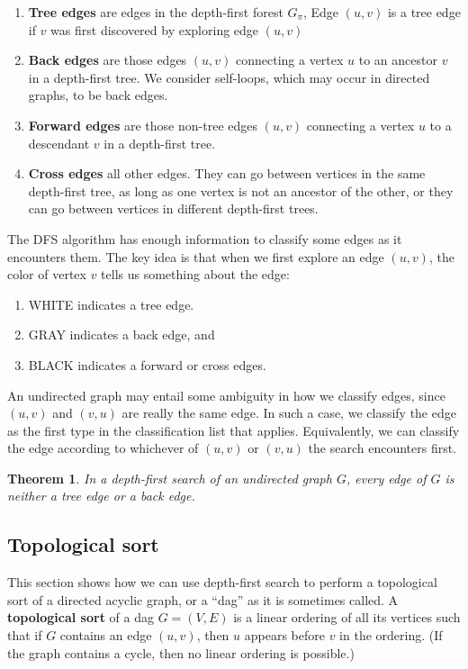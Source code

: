 \documentclass[12pt]{article}
\newtheorem{theorem}{Theorem}
\begin{document}
\begin{enumerate}
  \item \textbf{Tree edges} are edges in the depth-first forest $G_{\pi}$, Edge $(u,v)$ is a tree edge if $v$ was first discovered by exploring edge $(u,v)$
  \item \textbf{Back edges} are those edges $(u,v)$ connecting a vertex $u$ to an ancestor $v$ in a depth-first tree. We consider self-loops, which may occur in directed graphs, to be back edges.
  \item \textbf{Forward edges} are those non-tree edges $(u,v)$ connecting a vertex $u$ to a descendant $v$ in a depth-first tree.
  \item \textbf{Cross edges} all other edges. They can go between vertices in the same depth-first tree, as long as one vertex is not an ancestor of the other, or they can go between vertices in different depth-first trees.
\end{enumerate}

The DFS algorithm has enough information to classify some edges as it encounters them. The key idea is that when we first explore an edge $(u,v)$, the color of vertex $v$ tells us something about the edge:

\begin{enumerate}
  \item WHITE indicates a tree edge.
  \item GRAY indicates a back edge, and
  \item BLACK indicates a forward or cross edges.
\end{enumerate}

An undirected graph may entail some ambiguity in how we classify edges, since $(u,v)$ and $(v,u)$ are really the same edge. In such a case, we classify the edge as the first type in the classification list that applies. Equivalently, we can classify the edge according to whichever of $(u,v)$ or $(v,u)$ the search encounters first.

\begin{theorem}
  In a depth-first search of an undirected graph $G$, every edge of $G$ is neither a tree edge or a back edge.
\end{theorem}

\subsection{Topological sort}

This section shows how we can use depth-first search to perform a topological sort of a directed acyclic graph, or a ``dag'' as it is sometimes called. A \textbf{topological sort} of a dag $G = (V,E)$ is a linear ordering of all its vertices such that if $G$ contains an edge $(u,v)$, then $u$ appears before $v$ in the ordering. (If the graph contains a cycle, then no linear ordering is possible.) \\
\end{document}

